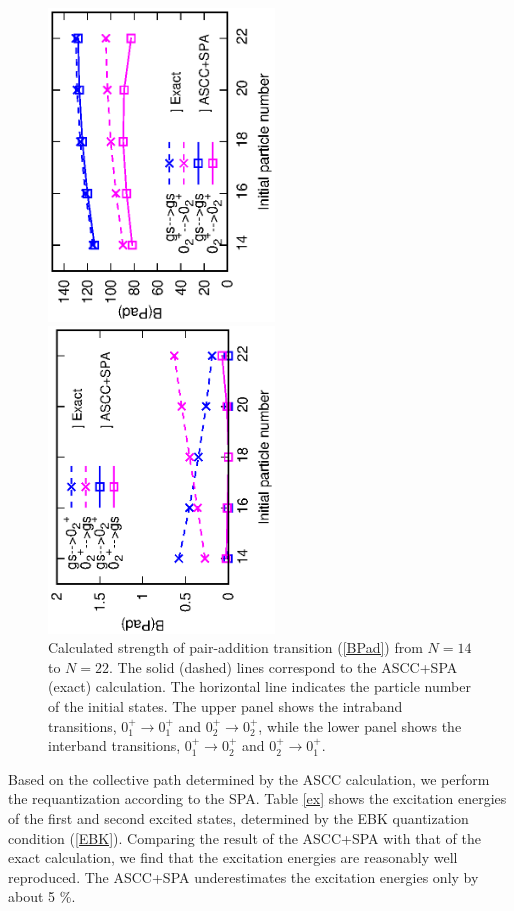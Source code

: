 \documentclass[11pt]{book} %
\begin{document}
\begin{figure}[htbp]
 \begin{center}
  \includegraphics[width=60mm,angle=-90]{images/intra_trans.eps}
 \end{center}
 \begin{center}
  \includegraphics[width=60mm,angle=-90]{images/inter_trans.eps}
 \end{center}
\caption{Calculated strength of pair-addition transition (\ref{BPad})
from $N=14$ to $N=22$. 
The solid (dashed) lines correspond to the ASCC+SPA (exact) calculation.
The horizontal line indicates the particle number of the initial states.
The upper panel shows the intraband transitions,
$0_1^+\to 0_1^+$ and $0_2^+\to 0_2^+$,
while the lower panel shows the interband transitions,
$0_1^+ \to 0_2^+$ and $0_2^+\to 0_1^+$.
}
 \label{3levelPad}
\end{figure}

Based on the collective path determined by the ASCC calculation,
we perform the requantization according to the SPA.
Table \ref{ex} shows the excitation energies of the first and second
excited states, determined by the EBK quantization condition (\ref{EBK}).
Comparing the result of the ASCC+SPA with that of the exact calculation,
we find that the excitation energies are reasonably well reproduced. 
The ASCC+SPA underestimates the excitation energies only by about 5 \%.
\end{document}

